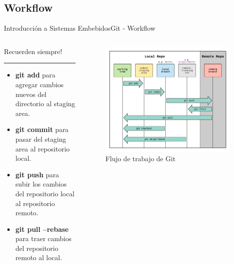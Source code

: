 \documentclass[aspectratio=169, xcolor=dvipsnames]{beamer}
\begin{document}
\subsection{Workflow}
\begin{frame}{Introducción a Sistemas Embebidos}{Git - Workflow}
\begin{columns}
\begin{column}{.5\textwidth}
    Recuerden siempre!
    \noindent\rule{\textwidth}{0.75pt}
    \begin{itemize}
        \item \textbf{git add} para agregar cambios nuevos del directorio al staging area.
        \item \textbf{git commit} para pasar del staging area al repositorio local.
        \item \textbf{git push} para subir los cambios del repositorio local al repositorio remoto.
        \item \textbf{git pull --rebase} para traer cambios del repositorio remoto al local.
    \end{itemize}
\end{column}
\begin{column}{.5\textwidth}
\begin{figure}
    \centering
    \includegraphics[width=0.9\linewidth]{resources/images/git_workflow.png}
    \caption{Flujo de trabajo de Git}
\end{figure}    
\end{column}
\end{columns}
\end{frame}
\end{document}
